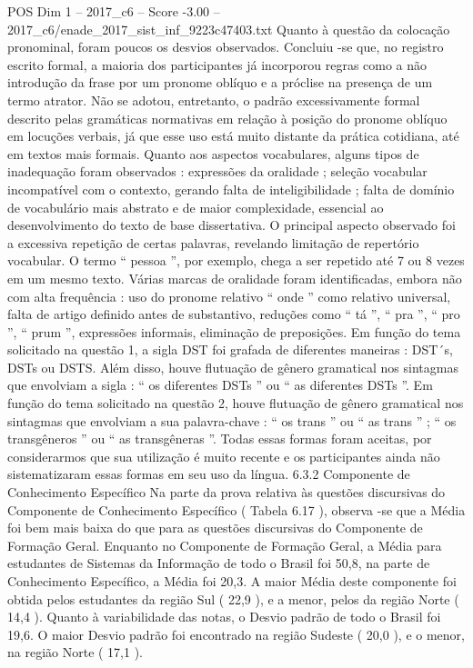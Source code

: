 \begin{textsample}{POS Dim 1 – 2017\_c6 – Score -3.00 – 2017\_c6/enade\_2017\_sist\_inf\_9223c47403.txt}
Quanto à questão da colocação pronominal, foram poucos os desvios observados.
Concluiu -se que, no registro escrito formal, a maioria dos participantes já incorporou regras como a não introdução da frase por um pronome oblíquo e a próclise na presença de um termo atrator.
Não se adotou, entretanto, o padrão excessivamente formal descrito pelas gramáticas normativas em relação à posição do pronome oblíquo em locuções verbais, já que esse uso está muito distante da prática cotidiana, até em textos mais formais.
Quanto aos aspectos vocabulares, alguns tipos de inadequação foram observados : expressões da oralidade ; seleção vocabular incompatível com o contexto, gerando falta de inteligibilidade ; falta de domínio de vocabulário mais abstrato e de maior complexidade, essencial ao desenvolvimento do texto de base dissertativa.
O principal aspecto observado foi a excessiva repetição de certas palavras, revelando limitação de repertório vocabular.
O termo “ pessoa ”, por exemplo, chega a ser repetido até 7 ou 8 vezes em um mesmo texto.
Várias marcas de oralidade foram identificadas, embora não com alta frequência : uso do pronome relativo “ onde ” como relativo universal, falta de artigo definido antes de substantivo, reduções como “ tá ”, “ pra ”, “ pro ”, “ prum ”, expressões informais, eliminação de preposições.
Em função do tema solicitado na questão 1, a sigla DST foi grafada de diferentes maneiras : DST´s, DSTs ou DSTS.
Além disso, houve flutuação de gênero gramatical nos sintagmas que envolviam a sigla : “ os diferentes DSTs ” ou “ as diferentes DSTs ”.
Em função do tema solicitado na questão 2, houve flutuação de gênero gramatical nos sintagmas que envolviam a sua palavra-chave : “ os trans ” ou “ as trans ” ; “ os transgêneros ” ou “ as transgêneras ”.
Todas essas formas foram aceitas, por considerarmos que sua utilização é muito recente e os participantes ainda não sistematizaram essas formas em seu uso da língua. 6.3.2 Componente de Conhecimento Específico Na parte da prova relativa às questões discursivas do Componente de Conhecimento Específico ( Tabela 6.17 ), observa -se que a Média foi bem mais baixa do que para as questões discursivas do Componente de Formação Geral.
Enquanto no Componente de Formação Geral, a Média para estudantes de Sistemas da Informação de todo o Brasil foi 50,8, na parte de Conhecimento Específico, a Média foi 20,3.
A maior Média deste componente foi obtida pelos estudantes da região Sul ( 22,9 ), e a menor, pelos da região Norte ( 14,4 ).
Quanto à variabilidade das notas, o Desvio padrão de todo o Brasil foi 19,6.
O maior Desvio padrão foi encontrado na região Sudeste ( 20,0 ), e o menor, na região Norte ( 17,1 ).

\end{textsample}
